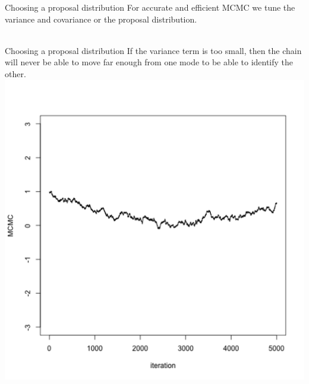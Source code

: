 \documentclass[compress]{beamer}
\begin{document}
\begin{frame}[label=sec-8-3]{Choosing a proposal distribution}
For accurate and efficient MCMC we \alert{tune} the variance and covariance or the proposal distribution.\\~\\
\end{frame}

\begin{frame}[label=sec-8-4]{Choosing a proposal distribution}
If the variance term is too small, then the chain will never be able to move far enough from one mode to be able to identify the other.
\includegraphics[width=1\linewidth]{Var1}
\end{frame}
\end{document}
